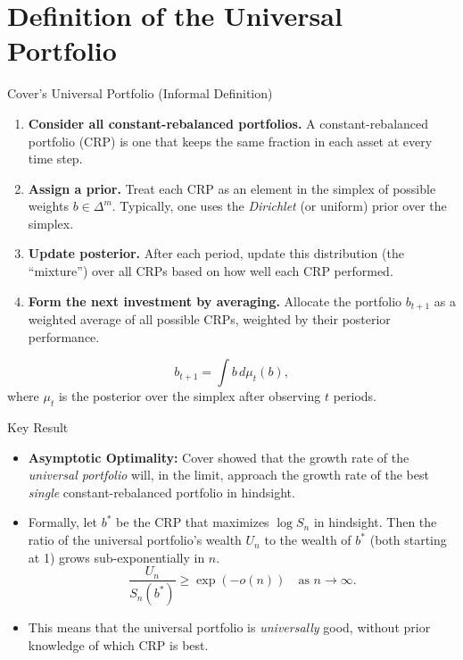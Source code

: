 \documentclass{beamer}
\begin{document}
\section{Definition of the Universal Portfolio}
\begin{frame}{Cover's Universal Portfolio (Informal Definition)}
  \begin{enumerate}
    \item \textbf{Consider all constant-rebalanced portfolios.} A constant-rebalanced portfolio (CRP) 
          is one that keeps the same fraction in each asset at every time step.
    \item \textbf{Assign a prior.} Treat each CRP as an element in the simplex of possible weights \(b \in \Delta^m\). 
          Typically, one uses the \emph{Dirichlet} (or uniform) prior over the simplex.
    \item \textbf{Update posterior.} After each period, update this distribution (the “mixture”) over all CRPs 
          based on how well each CRP performed.
    \item \textbf{Form the next investment by averaging.} Allocate the portfolio \(b_{t+1}\) as a weighted average 
          of all possible CRPs, weighted by their posterior performance.
  \end{enumerate}
  \[
    b_{t+1} = \int b \, d\mu_t(b),
  \]
  where \(\mu_t\) is the posterior over the simplex after observing \(t\) periods.
\end{frame}

\begin{frame}{Key Result}
  \begin{itemize}
    \item \textbf{Asymptotic Optimality:} Cover showed that the growth rate of the \emph{universal portfolio} 
          will, in the limit, approach the growth rate of the best \emph{single} constant-rebalanced portfolio 
          in hindsight.
    \item Formally, let \(b^*\) be the CRP that maximizes \(\log S_n\) in hindsight. Then the ratio of 
          the universal portfolio’s wealth \(U_n\) to the wealth of \(b^*\) (both starting at 1) 
          grows sub-exponentially in \(n\). 
    \[
      \frac{U_n}{S_n(b^*)} \ge \exp(-o(n)) \quad \text{as } n \to \infty.
    \]
    \item This means that the universal portfolio is \emph{universally} good, without prior knowledge 
          of which CRP is best.
  \end{itemize}
\end{frame}
\end{document}
